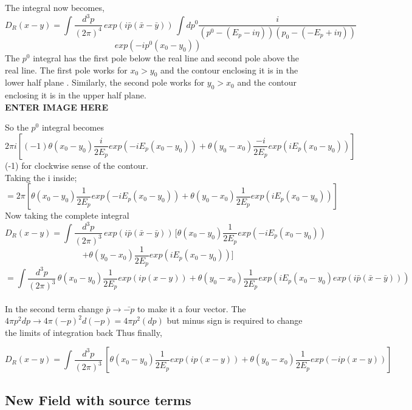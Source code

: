 \documentclass[11pt]{article}
\begin{document}
	The integral now becomes,
	\[
		D_R(x-y) = \int \frac{d^3p}{(2\pi)^4} \,exp(i\bar{p}(\bar{x}-\bar{y})) \, \int dp^0 \frac{i}{(p^0 -(E_p - i\eta))(p_0 - (-E_p + i\eta))} \,
	\]	
	\[
		 exp(-ip^0(x_0-y_0)) 
	\]
	The $p^0$ integral has the first pole below the real line and second pole above the real line. The first pole works for $x_0 > y_0$ and the contour enclosing it is in the lower half plane . Similarly, the second pole works for $y_0>x_0$ and the contour enclosing it is in the upper half plane.\\
	
	{\color{red}\textbf{ENTER IMAGE HERE}\\}
	
	So the $p^0$ integral becomes 
	\[
		2\pi i [(-1)\theta(x_0-y_0)\frac{i}{2E_p}exp(-iE_p(x_0-y_0)) + \theta(y_0-x_0)\frac{-i}{2E_p}exp(iE_p(x_0 - y_0))]
	\]
	(-1) for clockwise sense of the contour.\\
	Taking the i inside; %
	\[
		=	2\pi [\theta(x_0-y_0)\frac{1}{2E_p}exp(-iE_p(x_0-y_0)) + \theta(y_0-x_0)\frac{1}{2E_p}exp(iE_p(x_0 - y_0))]
	\]
	Now taking the complete integral
	\[
		D_R(x-y) = \int \frac{d^3p}{(2\pi)^3} \,exp(i\bar{p}(\bar{x}-\bar{y})) \, [\theta(x_0-y_0)\frac{1}{2E_p}exp(-iE_p(x_0-y_0)) 
	\]
	\[
		+ \theta(y_0-x_0)\frac{1}{2E_p}exp(iE_p(x_0 - y_0))] 
	\]
	\[
		= \int \frac{d^3p}{(2\pi)^3}  \, \theta(x_0-y_0)\frac{1}{2E_p}exp(ip(x-y)) 
		+ \theta(y_0-x_0)\frac{1}{2E_p}exp(iE_p(x_0 - y_0)exp(i\bar{p}(\bar{x}-\bar{y})))
	\]\\
	
	In the second term change $\bar{p}\rightarrow \bar{-p}$ to make it a four vector.  The $4\pi p^2 dp \rightarrow 4\pi(-p)^2 d(-p) = 4\pi p^2 (dp)$ but minus sign is required to change the limits of integration back
	Thus finally,
	
	\[
		\boxed{D_R(x-y) =  \int \frac{d^3p}{(2\pi)^3}  \, [\theta(x_0-y_0)\frac{1}{2E_p}exp(ip(x-y)) 
		+ \theta(y_0-x_0)\frac{1}{2E_p}exp(-ip(x- y))]}
	\]
	
	\subsection{New Field with source terms}
	
\end{document}
